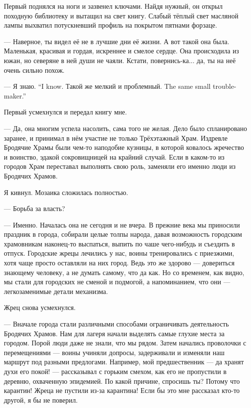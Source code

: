 Первый поднялся на ноги и зазвенел ключами.
Найдя нужный, он открыл походную библиотеку и вытащил на свет книгу.
Слабый тёплый свет масляной лампы выхватил потускневший профиль на покрытом пятнами форзаце.

--- Наверное, ты видел её не в лучшие дни её жизни.
А вот такой она была.
Маленькая, красивая и гордая, искреннее и смелое сердце.
Она происходила из южан, но северяне в ней души не чаяли.
Кстати, повернись-ка...
да, ты на неё очень сильно похож.

{--- Я знаю.}
{``I know.}
{Такой же мелкий и проблемный.}
{The same small trouble-maker.''}

Первый усмехнулся и передал книгу мне.

--- Да, она многим успела насолить, сама того не желая.
Дело было спланировано заранее, и принимал в нём участие не только Трёхэтажный Храм.
Издревле Бродячие Храмы были чем-то наподобие кузницы, в которой ковалось жречество и воинство, эдакой сокровищницей на крайний случай.
Если в каком-то из городов Храм переставал выполнять свою роль, заменяли его именно люди из Бродячих Храмов.

Я кивнул.
Мозаика сложилась полностью.

--- Борьба за власть?

--- Именно.
Началась она не сегодня и не вчера.
В прежние века мы приносили праздник в города, собирали целые толпы народа, давая возможность городским храмовникам наконец-то выспаться, выпить по чаше чего-нибудь и съездить в отпуск.
Городские жрецы лечились у нас, воины тренировались с приезжими, хотя чаще просто оставляли на них город.
Ведь это же здорово --- довериться знающему человеку, а не думать самому, что да как.
Но со временем, как видно, мы стали для городских не сменой и подмогой, а напоминанием, что они --- легкозаменимые детали механизма.

Жрец снова усмехнулся.

--- Вначале города стали различными способами ограничивать деятельность Бродячих Храмов.
Нам для лагеря начали выделять самые глухие места за городом.
Порой люди даже не знали, что мы рядом.
Затем начались проволочки с перемещениями --- воины учиняли допросы, задерживали и изменяли наш маршрут под разными предлогами.
Например, мой предшественник --- да хранят духи его покой! --- рассказывал с горьким смехом, как его не пропустили в деревню, охваченную эпидемией.
По какой причине, спросишь ты?
Потому что карантин!
Жреца не пустили из-за карантина!
Если бы это мне рассказал кто-то другой, я бы не поверил.

